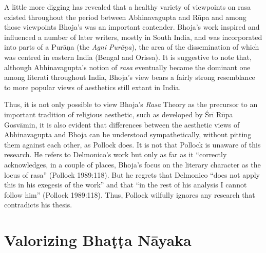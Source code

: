 \begin{myquote}
A little more digging has revealed that a healthy variety of viewpoints on rasa existed throughout the period between Abhinavagupta and Rūpa and among those viewpoints Bhoja's was an important contender. Bhoja's work inspired and influenced a number of later writers, mostly in South India, and was incorporated into parts of a Purāṇa (the \textsl{Agni Purāṇa}), the area of the dissemination of which was centred in eastern India (Bengal and Orissa). It is suggestive to note that, although Abhinavagupta's notion of \textsl{rasa} eventually became the dominant one among literati throughout India, Bhoja's view bears a fairly strong resemblance to more popular views of aesthetics still extant in India.
\end{myquote}

Thus, it is not only possible to view Bhoja's \textsl{Rasa}
 Theory as the precursor to an important tradition of religious aesthetic, such as developed by Śrī Rūpa Gosvāmin, it is also evident that differences between the aesthetic views of Abhinavagupta and Bhoja can be understood sympathetically, without pitting them against each other, as Pollock does. It is not that Pollock is unaware of this research. He refers to Delmonico's
 work but only as far as it ``correctly acknowledges, in a couple of places, Bhoja's focus on the literary character as the locus of rasa'' (Pollock 1989:118). But he regrets that Delmonico ``does not apply this in his exegesis of the work'' and that ``in the rest of his analysis I cannot follow him'' (Pollock 1989:118). Thus, Pollock wilfully ignores any research that contradicts his thesis.

\section*{Valorizing Bhaṭṭa Nāyaka}

